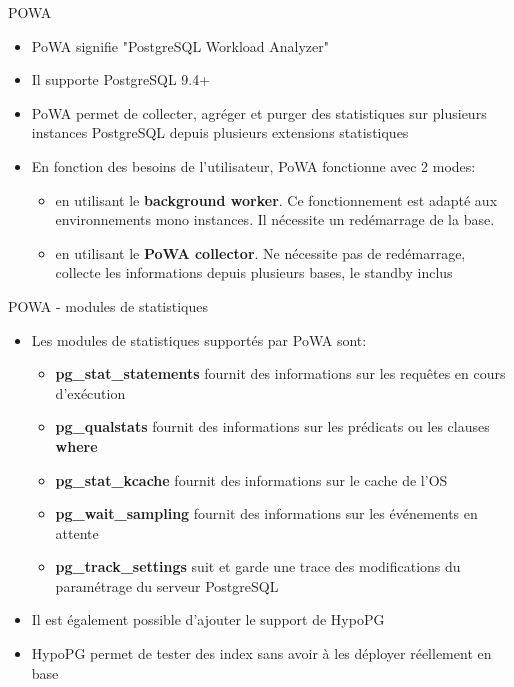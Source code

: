 \begin{frame}{POWA}

   \begin{itemize}
      \item PoWA signifie "PostgreSQL Workload Analyzer"
      \item Il supporte PostgreSQL 9.4+
      \item PoWA permet de collecter, agréger et purger des statistiques sur plusieurs instances PostgreSQL depuis plusieurs extensions statistiques
      \item En fonction des besoins de l'utilisateur, PoWA fonctionne avec 2 modes:
   \begin{itemize}
         \item en utilisant le \textbf{background worker}. Ce fonctionnement est adapté aux environnements mono instances. Il nécessite un redémarrage de la base.
         \item en utilisant le \textbf{PoWA collector}. Ne nécessite pas de redémarrage, collecte les informations depuis plusieurs bases, le standby inclus
   \end{itemize}

   \end{itemize}

\begin{tiny}
\begin{toile}
\end{toile}
\end{tiny}

\end{frame}


\begin{frame}{POWA - modules de statistiques}

   \begin{itemize}
      \item Les modules de statistiques supportés par PoWA sont:
      \begin{itemize}
         \item \textbf{pg\_stat\_statements} fournit des informations sur les requêtes en cours d'exécution
         \item \textbf{pg\_qualstats} fournit des informations sur les prédicats ou les clauses \textbf{where}
         \item \textbf{pg\_stat\_kcache} fournit des informations sur le cache de l'OS
         \item \textbf{pg\_wait\_sampling} fournit des informations sur les événements en attente
         \item \textbf{pg\_track\_settings} suit et garde une trace des modifications du paramétrage du serveur PostgreSQL
      \end{itemize}
      \item Il est également possible d'ajouter le support de HypoPG
      \item HypoPG permet de tester des index sans avoir à les déployer réellement en base
   \end{itemize}

\end{frame}

